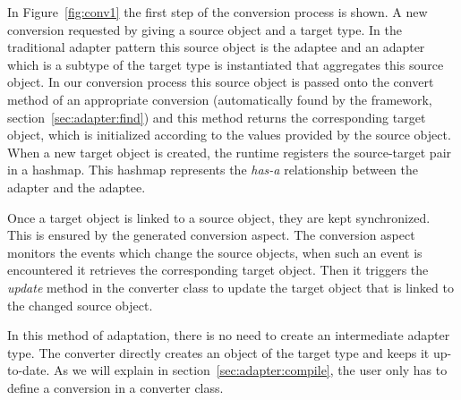 In Figure~\ref{fig:conv1} the first step of the conversion process is shown. 
A new conversion requested by giving a source object and a target type. 
In the traditional adapter pattern this source object is the adaptee and an adapter which is a subtype of the target type is instantiated that aggregates this source object. 
In our conversion process this source object is passed onto the convert method of an appropriate conversion (automatically found by the framework, section~\ref{sec:adapter:find}) and this method returns the corresponding target object, which is initialized according to the values provided by the source object. 
When a new target object is created, the \zamk runtime registers the source-target pair in a hashmap. 
This hashmap represents the \emph{has-a} relationship between the adapter and the adaptee. 

Once a target object is linked to a source object, they are kept synchronized. 
This is ensured by the generated conversion aspect. 
The conversion aspect monitors the events which change the source objects, when such an event is encountered it retrieves the corresponding target object. 
Then it triggers the \emph{update} method in the converter class to update the target object that is linked to the changed source object.

\begin{figure}
\end{figure}

In this method of adaptation, there is no need to create an intermediate adapter type.
The converter directly creates an object of the target type and keeps it up-to-date. 
As we will explain in section~\ref{sec:adapter:compile}, the user only has to define a conversion in a converter class. 

